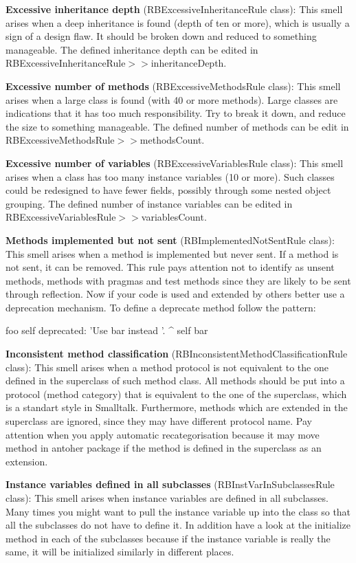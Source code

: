 \textbf{Excessive inheritance depth} (RBExcessiveInheritanceRule class): This smell arises when a deep inheritance is found (depth of ten or more), which is usually a sign of a design flaw. It should be broken down and reduced to something manageable. The defined inheritance depth can be edited in RBExcessiveInheritanceRule$>>$inheritanceDepth.

\textbf{Excessive number of methods} (RBExcessiveMethodsRule class): This smell arises when a large class is found (with 40 or more methods). Large classes are indications that it has too much responsibility. Try to break it down, and reduce the size to something manageable. The defined number of methods can be edit in RBExcessiveMethodsRule$>>$methodsCount.

\textbf{Excessive number of variables} (RBExcessiveVariablesRule class): This smell arises when a class has too many instance variables (10 or more). Such classes could be redesigned to have fewer fields, possibly through some nested object grouping. The defined number of instance variables can be edited in RBExcessiveVariablesRule$>>$variablesCount.

\textbf{Methods implemented but not sent} (RBImplementedNotSentRule class): This smell arises when a method is implemented but never sent. If a method is not sent, it can be removed. This rule pays attention not to identify as unsent methods, methods with pragmas and test methods since they are likely to be sent through reflection.
	Now if your code is used and extended by others better use a deprecation mechanism. To define a deprecate method follow the pattern: 
	
	foo
		self deprecated: 'Use bar instead '. 
		^ self bar
		 

\textbf{Inconsistent method classification} (RBInconsistentMethodClassificationRule class): This smell arises when a method protocol is not equivalent to the one defined in the superclass of such method class. All methods should be put into a protocol (method category) that is equivalent to the one of the superclass, which is a standart style in Smalltalk. Furthermore, methods which are extended in the superclass are ignored, since they may have different protocol name. Pay attention when you apply automatic recategorisation because it may move method in antoher package if the method is defined in the superclass as an extension.

\textbf{Instance variables defined in all subclasses} (RBInstVarInSubclassesRule class): This smell arises when instance variables are defined in all subclasses. Many times you might want to pull the instance variable up into the class so that all the subclasses do not have to define it. In addition have a look at the initialize method in each of the subclasses because if the instance variable is really the same, it will be initialized similarly in different places.

